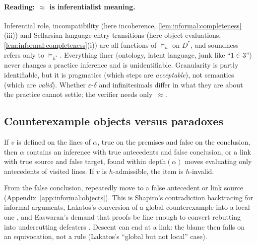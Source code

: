 \paragraph{Reading: $\approx$ is inferentialist meaning.}
Inferential role, incompatibility (here incoherence, \cref{lem:informal:completeness}(iii)) and Sellarsian language-entry transitions (here object evaluations, \cref{lem:informal:completeness}(i)) are all functions of ${\models_h}$ on $D^*$, and soundness refers only to ${\models_{h^*}}$. Everything finer (ontology, latent language, junk like ``$1\in3$'') never changes a practice inference and is unidentifiable. Granularity is partly identifiable, but it is pragmatics (which steps are \emph{acceptable}), not semantics (which are \emph{valid}). Whether $\varepsilon$-$\delta$ and infinitesimals differ in what they are about the practice cannot settle; the verifier needs only~$\approx$.

\subsection{Counterexample objects versus paradoxes}\label{sec:informal:objects}

\begin{lemma}\label{lem:informal:descent}
If $v$ is defined on the lines of $\alpha$, true on the premises and false on the conclusion, then $\alpha$ contains an inference with true antecedents and false conclusion, or a link with true source and false target, found within $\mathrm{depth}(\alpha)$ moves evaluating only antecedents of visited lines. If $v$ is $h$-admissible, the item is $h$-invalid. \hfill{}\ 
\end{lemma}

From the false conclusion, repeatedly move to a false antecedent or link source (Appendix~\ref{app:informal:objects}). This is Shapiro's contradiction backtracing \citep{shapiro1983algorithmic} for informal arguments, Lakatos's conversion of a global counterexample into a local one \citep{lakatos1976proofs}, and Easwaran's demand that proofs be fine enough to convert rebutting into undercutting defeaters \citep{easwaran2015rebutting}. Descent can end at a link: the blame then falls on an equivocation, not a rule (Lakatos's ``global but not local'' case).

